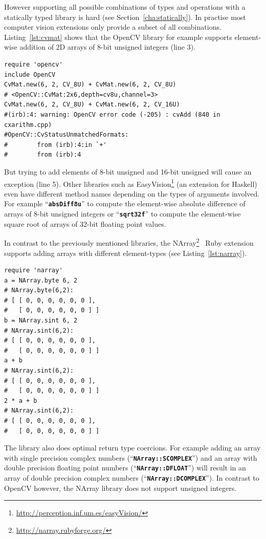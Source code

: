 \documentclass[12pt,a4paper,oneside,openright]{book}
\newcommand{\Eg}{For ex\-am\-ple }
\newcommand{\sct}[1]{Section~\ref{cha:#1}}
\newcommand{\lst}[1]{Listing~\ref{lst:#1}}
\newcommand{\code}[1]{``\texttt{\textbf{\textcolor{codegray}{\small{#1}}}}''}
\newcommand{\rubyout}{Comment lines (preceded with ``\#'') show the output of the program}
\begin{document}
\begin{CJK}{UTF8}{}
However supporting all possible combinations of types and operations with a statically typed library is hard (see \sct{statically}). In practise most computer vision extensions only provide a subset of all combinations. \lst{cvmat} shows that the OpenCV library for example supports element-wise addition of \ac{2D} arrays of 8-bit unsigned integers (line 3).
\lstset{language=Ruby,frame=single,numbers=left}
\begin{lstlisting}[float=htbp,caption={Using OpenCV in Ruby. \rubyout},label=lst:cvmat]
require 'opencv'
include OpenCV
CvMat.new(6, 2, CV_8U) + CvMat.new(6, 2, CV_8U)
# <OpenCV::CvMat:2x6,depth=cv8u,channel=3>
CvMat.new(6, 2, CV_8U) + CvMat.new(6, 2, CV_16U)
#(irb):4: warning: OpenCV error code (-205) : cvAdd (840 in cxarithm.cpp)
#OpenCV::CvStatusUnmatchedFormats: 
#        from (irb):4:in `+'
#        from (irb):4
\end{lstlisting}
But trying to add elements of 8-bit unsigned and 16-bit unsigned will cause an exception (line 5). Other libraries such as EasyVision\footnote{\url{http://perception.inf.um.es/easyVision/}} (an extension for Haskell) even have different method names depending on the types of arguments involved. \Eg \code{absDiff8u} to compute the element-wise absolute difference of arrays of 8-bit unsigned integers or \code{sqrt32f} to compute the element-wise square root of arrays of 32-bit floating point values.

In contrast to the previously mentioned libraries, the NArray\footnote{\url{http://narray.rubyforge.org/}}~\citep{narray1,narray2} Ruby extension supports adding arrays with different element-types (see \lst{narray}).
\lstset{language=Ruby,frame=single,numbers=none}
\begin{lstlisting}[float=htbp,caption={Using NArray in Ruby. \rubyout},label=lst:narray]
require 'narray'
a = NArray.byte 6, 2
# NArray.byte(6,2): 
# [ [ 0, 0, 0, 0, 0, 0 ], 
#   [ 0, 0, 0, 0, 0, 0 ] ]
b = NArray.sint 6, 2
# NArray.sint(6,2): 
# [ [ 0, 0, 0, 0, 0, 0 ], 
#   [ 0, 0, 0, 0, 0, 0 ] ]
a + b
# NArray.sint(6,2): 
# [ [ 0, 0, 0, 0, 0, 0 ], 
#   [ 0, 0, 0, 0, 0, 0 ] ]
2 * a + b
# NArray.sint(6,2): 
# [ [ 0, 0, 0, 0, 0, 0 ], 
#   [ 0, 0, 0, 0, 0, 0 ] ]
\end{lstlisting}
The library also does optimal return type coercions. \Eg adding an array with single precision complex numbers (\code{NArray::SCOMPLEX}) and an array with double precision floating point numbers (\code{NArray::DFLOAT}) will result in an array of double precision complex numbers (\code{NArray::DCOMPLEX}). In contrast to OpenCV however, the NArray library does not support unsigned integers.


\end{CJK}
\end{document}
